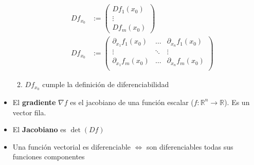 \documentclass[a4paper,twocolumn]{extarticle}
\newcommand{\R}{\mathbb{R}}
\begin{document}
\begin{itemize}
\begin{enumerate}
\begin{align*}
			Df_{x_0} &:= \left(\begin{array}{c}
			Df_1(x_0) \\\hline
			\vdots \\\hline
			Df_m(x_0) 
			\end{array}\right) \\
			Df_{x_0} &:= \left(\begin{array}{ccc}
			\partial_{x_1}f_1(x_0) & \dots & \partial_{x_n}f_1(x_0) \\
			\vdots & \ddots & \vdots \\
			\partial_{x_1}f_m(x_0) & \dots & \partial_{x_n}f_m(x_0) \\
			\end{array}\right)
		\end{align*}
		\item $Df_{x_0}$ cumple la definición de diferenciabilidad
	\end{enumerate}
	\item El \textbf{gradiente} $\nabla f$ es el jacobiano de una función escalar ($f: \R^n \to \R$). Es un vector fila.
	\item El \textbf{Jacobiano} es $\det(Df)$
	\item Una función vectorial es diferenciable $\iff$ son diferenciables todas sus funciones componentes
\end{itemize}
\end{document}

